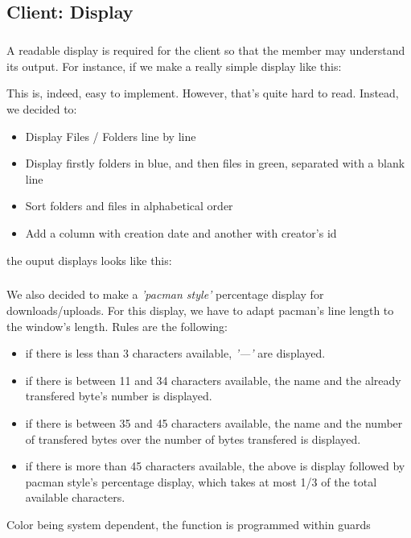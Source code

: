 \documentclass[12pt,a4paper,twoside]{article}
\begin{document}
		\subsection{Client: Display} %
			\subparagraph*{}
				A readable display is required for the client so that the member may understand its output. For instance, if we make a really simple display like this:
				
				This is, indeed, easy to implement. However, that's quite hard to read. Instead, we decided to:
				\begin{itemize}
					\item{} Display Files / Folders line by line
					\item{} Display firstly folders in blue, and then files in green, separated with a blank line
					\item{} Sort folders and files in alphabetical order
					\item{} Add a column with creation date and another with creator's id
				\end{itemize}
				the ouput displays looks like this:
				
			\subparagraph*{}
				We also decided to make a \textit{'pacman style'} percentage display for downloads/uploads. For this display, we have to adapt pacman's line length to the window's length. Rules are the following:
				\begin{itemize}
					 \item{} if there is less than 3 characters available, \textit{'—'} are displayed.
					 \item{} if there is between 11 and 34 characters available, the name and the already transfered byte's number is displayed.
					 \item{} if there is between 35 and 45 characters available, the name and the number of transfered bytes over the number of bytes transfered is displayed.
					 \item{} if there is more than 45 characters available, the above is display followed by pacman style's percentage display, which takes at most 1/3 of the total available characters.
				 \end{itemize}
				Color being system dependent, the function is programmed within guards
\end{document}
